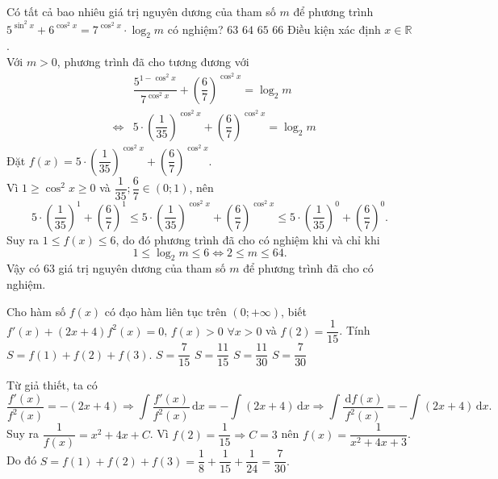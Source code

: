\begin{ex}%
	Có tất cả bao nhiêu giá trị nguyên dương của tham số $m$ để phương trình $5^{\sin^2x}+6^{\cos^2x}=7^{\cos^2x}\cdot \log_2m$ có nghiệm?
		\choice
	{\True $63$}
	{$64$}
	{$65$}
	{$66$}
	\loigiai
	{Điều kiện xác định $x \in \mathbb{R}$.\\
		Với $m>0 $, phương trình đã cho tương đương với
		\begin{eqnarray*}
	& &	\dfrac{5^{1-\cos^2x}}{7^{\cos^2x}} +\left(\dfrac{6}{7}\right)^{\cos^2x} = \log_2m\\
	&\Leftrightarrow & 5\cdot \left(\dfrac{1}{35}\right)^{\cos^2x}+\left(\dfrac{6}{7}\right)^{\cos^2x} =\log_2m
		\end{eqnarray*}
	Đặt $f(x)= 5\cdot \left(\dfrac{1}{35}\right)^{\cos^2x}+\left(\dfrac{6}{7}\right)^{\cos^2x}  $.\\
	Vì $1 \geq \cos^2x\geq 0$ và $\dfrac{1}{35}; \dfrac{6}{7} \in (0;1)$, nên $$ 5\cdot \left( \dfrac{1}{35}\right)^1+\left(\dfrac{6}{7}\right)^1 \leq 5\cdot \left(\dfrac{1}{35}\right)^{\cos^2x}+\left(\dfrac{6}{7}\right)^{\cos^2x} \leq 5\cdot \left( \dfrac{1}{35}\right)^0+\left( \dfrac{6}{7}\right)^0.$$
	Suy ra $1\leq f(x) \leq 6$, do đó phương trình đã cho có nghiệm khi và chỉ khi $$1\leq \log_2m \leq 6 \Leftrightarrow 2 \leq m \leq 64.$$
	Vậy có $63$ giá trị nguyên dương của tham số $m$ để phương trình đã cho có nghiệm.
	}
\end{ex}

\begin{ex}%
	Cho hàm số $f(x)$ có đạo hàm liên tục trên $(0;+\infty)$, biết $f'(x)+(2x+4)f^2(x)=0$, $f(x)>0\,\, \forall x>0$ và $f(2)=\dfrac{1}{15}$. Tính $S=f(1)+f(2)+f(3).$
		\choice
	{$S= \dfrac{7}{15}$}
	{$S=\dfrac{11}{15}$}
	{$S=\dfrac{11}{30}$}
	{\True $S=\dfrac{7}{30}$}
	\loigiai
	{ Từ giả thiết, ta có $$\dfrac{f'(x)}{f^2(x)}=-(2x+4) \Rightarrow \displaystyle\int\limits \dfrac{f'(x)}{f^2(x)}\mathrm{\,d}x=- \displaystyle\int\limits (2x+4)\mathrm{\,d}x \Rightarrow \displaystyle\int\limits \dfrac{\mathrm{\,d}f(x)}{f^2(x)}=-\displaystyle\int\limits (2x+4)\mathrm{\,d}x. $$
	Suy ra $\dfrac{1}{f(x)}=x^2+4x+C$. Vì $f(2)=\dfrac{1}{15} \Rightarrow C= 3$ nên $f(x)=\dfrac{1}{x^2+4x+3}$.\\
	Do đó  $S=f(1)+f(2)+f(3)=\dfrac{1}{8}+\dfrac{1}{15}+\dfrac{1}{24}=\dfrac{7}{30}.$
		
	} 
\end{ex}

